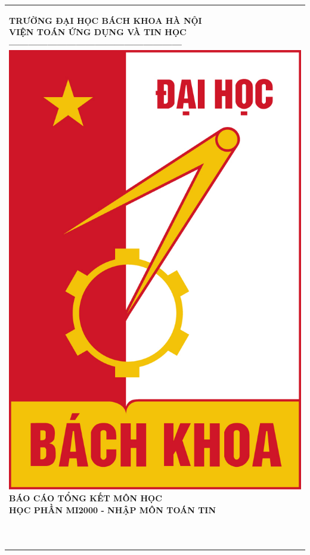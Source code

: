 \documentclass[12pt,a4paper]{report}
\newcommand{\Khung}[2]{
    \begin{tabular}{|l|}
        \hline\rule[-2ex]{0pt}{5.5ex}
        \parbox{#1}{#2}\\
        \hline
    \end{tabular}
}
\begin{document}
    \Khung{0.92\textwidth}{
        \begin{center}
            \normalsize
            \textbf{TRƯỜNG ĐẠI HỌC BÁCH KHOA HÀ NỘI}\\
            \normalsize
            \textbf{VIỆN TOÁN ỨNG DỤNG VÀ TIN HỌC}\\
            \textbf{------------------------------------------------------}\\[0.4cm]
            \includegraphics[scale=.4]{bk.jpg}\\[1.2cm]
            \textbf{{\large BÁO CÁO TỔNG KẾT MÔN HỌC}}\\[0.3cm]
            \textbf{HỌC PHẦN MI2000 - NHẬP MÔN TOÁN TIN}\\[1cm]
            \textbf{{\large}}\\[0.2cm]
            \textbf{{\large}}\\[3cm]
        \end{center}
       
}
\end{document}
